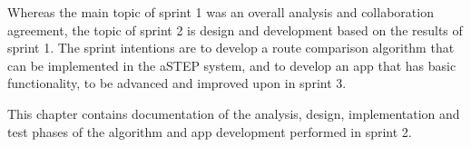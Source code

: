 Whereas the main topic of sprint 1 was an overall analysis and collaboration agreement, the topic of sprint 2 is design and development based on the results of sprint 1. The sprint intentions are to develop a route comparison algorithm that can be implemented in the aSTEP system, and to develop an app that has basic functionality, to be advanced and improved upon in sprint 3.

This chapter contains documentation of the analysis, design, implementation and test phases of the algorithm and app development performed in sprint 2.